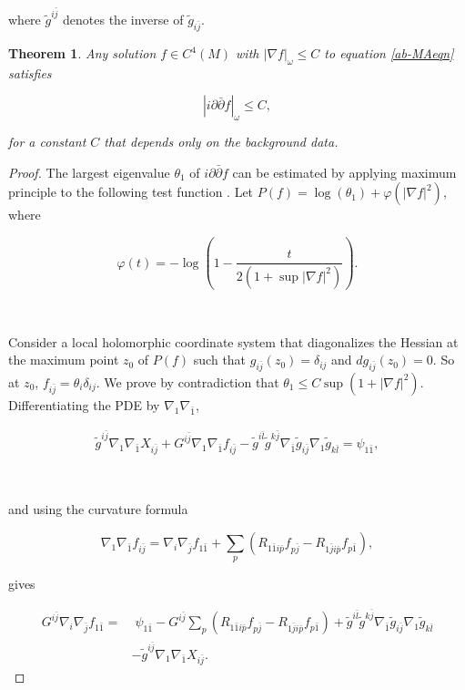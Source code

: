 \documentclass[11pt,letterpaper]{amsart}
\newcommand{\bj}{\bar{j}}
\newcommand{\bl}{\bar{l}}
\newcommand{\pbp}{\partial \bar{\partial}}
\newtheorem{theorem}{Theorem}[section]
\numberwithin{equation}{section}
\begin{document}
\begin{itemize}
\noindent where $\tilde g^{i \bj}$ denotes the inverse of $\tilde g_{i \bj}$.


\begin{theorem}
   Any solution $f \in C^4(M)$ with $|\nabla f|_{\omega} \leq C$ to equation \eqref{ab-MAeqn} satisfies

   $$|i\pbp f|_{\omega} \leq C,$$

   \noindent for a constant $C$ that depends only on the background data.
\end{theorem}



\begin{proof}

 
The largest eigenvalue $\theta_1$ of $i \pbp f$ can be estimated by applying maximum principle to the following test function \cite{TW17,Szekelyhidi18,STW17}. Let $P(f) = \log(\theta_1) + \varphi(|\nabla f|^2)$, where 

$$\varphi(t) = -\log\left(1 - \frac{t}{2(1+ \sup|\nabla f|^2)}\right).$$

\ 

Consider a local holomorphic coordinate system that diagonalizes the Hessian at the maximum point $z_0$ of $P(f)$ such that $g_{i \bj}(z_0) = \delta_{i j}$ and $dg_{i \bj}(z_0) = 0$. So at $z_0$, $f_{i \bj} = \theta_i \delta_{ij}$. We prove by contradiction that $\theta_1 \leq C \sup( 1+ |\nabla f|^2)$. Differentiating the PDE by $\nabla_1 \nabla_{\bar 1}$,

\begin{equation}
    \begin{aligned}
        \tilde g^{i \bj}  \nabla_{1} \nabla_{\bar 1} X_{i \bj} + G^{i \bj} \nabla_{1} \nabla_{\bar 1} f_{i \bj} - \tilde g^{i \bl}\tilde g^{k \bj} \nabla_{\bar 1} \tilde{g}_{i \bj} \nabla_1 \tilde g_{k \bl} = \psi_{1 \bar 1},
    \end{aligned}
\end{equation}

\

\noindent and using the curvature formula

$$\nabla_{1} \nabla_{\bar 1} f_{i \bj} =\nabla_i \nabla_{\bar j} f_{1 \bar 1} + \sum_p (R_{1 \bar 1 i \bar p} f_{p \bar j} - R_{1 \bar j i \bar p} f_{p \bar 1}),$$

\noindent gives 

\begin{equation}
    \begin{aligned}
          G^{i \bj}\nabla_i \nabla_{\bar j} f_{1 \bar 1} =& \; \psi_{1 \bar 1}-G^{i \bj} \sum_p (R_{1 \bar 1 i \bar p} f_{p \bar j} - R_{1 \bar j i \bar p} f_{p \bar 1})  + \tilde g^{i \bl}\tilde g^{k \bj} \nabla_{\bar 1} \tilde g_{i \bj} \nabla_1 \tilde g_{k \bl}\\
          & -  \tilde g^{i \bj}  \nabla_{1} \nabla_{\bar 1} X_{i \bj}.
    \end{aligned}
\end{equation}



\end{proof}
\end{itemize}
\end{document}
